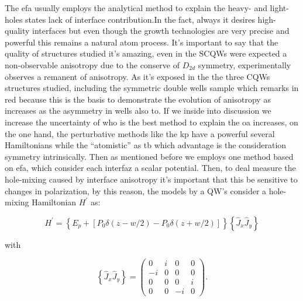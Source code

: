 The \gls{efa} usually employs the analytical method to explain the heavy- and light- holes states lack of interface contribution\cite{xiao2001determination}.In the fact,  always it desires high-quality interfaces but even though the growth technologies are very precise and powerful this remains a natural atom process. It's important to say that the quality of structures studied it's amazing, even in the SCQWs were expected a non-observable anisotropy due to the conserve of $D_{2d}$ symmetry, experimentally observes a remanent of anisotropy. As it's exposed in the  the three  CQWs structures studied, including the symmetric double wells sample which remarks in red because this is the basis to demonstrate the evolution of anisotropy as increases as the asymmetry in wells also to. If we inside into discussion we increase the uncertainty of who is the best method to explain the \gls{oa} increases, on the one hand, the perturbative methods like the \gls{kp} have a powerful several  Hamiltonians while the ``atomistic''  as \gls{tb} which advantage is the consideration symmetry intrinsically. Then as mentioned before we employs one method based on \gls{efa}, which consider each interfaz a scalar potential\cite{krebs1998inversion,chen2002interface,ivchenko1996heavylight,xiao2001determination}. 
Then, to deal measure the hole-mixing caused by interface  anisotropy it's important that this be sensitive to changes in polarization, by this reason, the models by a \gls{QW}'s consider a hole-mixing Hamiltonian  $H^\prime$ as\cite{ye2001inplane,chen2002interface,xiao2001determination}:

\begin{equation}\label{eqn:chapter-2-sec-anisotropy-model-common-hamiltonian}
	H^{\prime}= \left\lbrace E_{p} + \left[P_{0}\delta\left(z-w/2\right)-P_{0}\delta\left(z+w/2\right)\right]\right\rbrace\left\lbrace \hat{J}_{x}\hat{J}_{y}\right\rbrace
\end{equation}

with

\begin{equation}\label{eqn:chapter-2-sec-anisotropy-model-jotas}
	\left\lbrace \hat{J}_{x}\hat{J}_{y}\right\rbrace=
	\begin{pmatrix}
	0 & i & 0  & 0\\	
   -i & 0 & 0  & 0\\	
	0 & 0 & 0  & i\\	
	0 & 0 & -i & 0
	\end{pmatrix}.
\end{equation}

